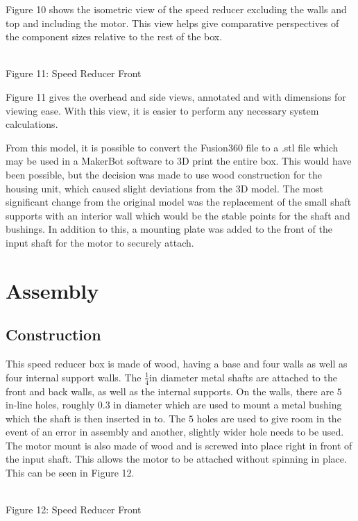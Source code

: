\documentclass{article}
\begin{document}
Figure 10 shows the isometric view of the speed reducer excluding the walls and top and including the motor. This view helps give comparative perspectives of the component sizes relative to the rest of the box.

\begin{center}
\\
\scriptsize{
Figure 11: Speed Reducer Front
}
\end{center}

Figure 11 gives the overhead and side views, annotated and with dimensions for viewing ease. With this view, it is easier to perform any necessary system calculations.

From this model, it is possible to convert the Fusion360 file to a .stl file which may be used in a MakerBot software to 3D print the entire box. This would have been possible, but the decision was made to use wood construction for the housing unit, which caused slight deviations from the 3D model. The most significant change from the original model was the replacement of the small shaft supports with an interior wall which would be the stable points for the shaft and bushings. In addition to this, a mounting plate was added to the front of the input shaft for the motor to securely attach.

\section{Assembly}
\subsection{Construction}
This speed reducer box is made of wood, having a base and four walls as well as four internal support walls. The $\frac{1}{4}$in diameter metal shafts are attached to the front and back walls, as well as the internal supports. On the walls, there are $5$ in-line holes, roughly $0.3$ in diameter which are used to mount a metal bushing which the shaft is then inserted in to. The $5$ holes are used to give room in the event of an error in assembly and another, slightly wider hole needs to be used. The motor mount is also made of wood and is screwed into place right in front of the input shaft. This allows the motor to be attached without spinning in place. This can be seen in Figure 12.

\begin{center}
\\
\scriptsize{
Figure 12: Speed Reducer Front
}
\end{center}
\end{document}
